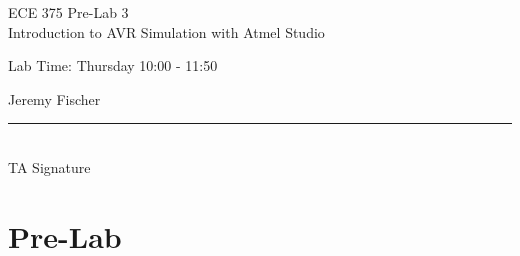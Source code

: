 \documentclass[12pt,letterpaper]{article}
\begin{document}
\begin{titlepage}
    \vspace*{4cm}
    \begin{flushright}
    {\huge
        ECE 375 Pre-Lab 3\\[1cm]
    }
    {\large
       Introduction to AVR Simulation with Atmel Studio
    }
    \end{flushright}
    \begin{flushleft}
    Lab Time: Thursday 10:00 - 11:50
    \end{flushleft}
    \begin{flushright}
    Jeremy Fischer
    
    \vfill
    \rule{5in}{.5mm}\\
    TA Signature
    \end{flushright}

\end{titlepage}


\section{Pre-Lab}
\end{document}
